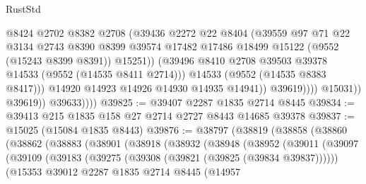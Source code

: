 \begin{lexlean}{RustStd}
\begin{coremodule}
                                  @8424
                                  @2702
                                  @8382
                                  @2708
                                  (@39436
                                    @2272
                                    @22
                                    @8404
                                    (@39559
                                      @97
                                      @71
                                      @22
                                      @3134
                                      @2743
                                      @8390
                                      @8399
                                      @39574
                                      @17482
                                      @17486
                                      @18499
                                      @15122
                                      (@9552 (@15243 @8399 @8391))
                                      @15251))
                                  (@39496
                                    @8410
                                    @2708
                                    @39503
                                    @39378
                                    @14533
                                    (@9552 (@14535 @8411 @2714)))
                                  @14533
                                  (@9552 (@14535 @8383 @8417)))
                                @14920
                                @14923
                                @14926
                                @14930
                                @14935
                                @14941))
                            @39619))))
                    @15031))
                @39619))
            @39633))))
@39825 := @39407 @2287 @1835 @2714 @8445
@39834 := @39413 @215 @1835 @158 @27 @2714 @2727 @8443 @14685 @39378
@39837 := @15025 (@15084 @1835 @8443)
@39876 := @38797
    (@38819
      (@38858
        (@38860
          (@38862
            (@38883
              (@38901
                (@38918
                  (@38932
                    (@38948
                      (@38952
                        (@39011
                          (@39097
                            (@39109
                              (@39183 (@39275 (@39308 (@39821 (@39825 (@39834 @39837))))))
                              (@15353
                                @39012
                                @2287
                                @1835
                                @2714
                                @8445
                                (@14957

\end{coremodule}
\end{lexlean}

